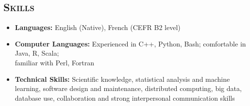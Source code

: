 \documentclass[10pt]{res} %
\begin{document}
\begin{resume}
\section{\textsc{Skills}}
\begin{itemize}
\item \textbf{Languages:} English (Native), French (CEFR B2 level)
\item \textbf{Computer Languages:} Experienced in C++, Python, Bash; comfortable in Java, R, Scala; \\ familiar with Perl, Fortran
\item \textbf{Technical Skills:} Scientific knowledge, statistical analysis and machine learning, software design and maintenance, distributed computing, big data, database use, collaboration and strong interpersonal communication skills
\end{itemize} 

\end{resume}
\end{document}
